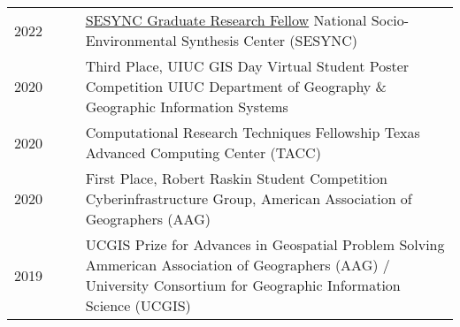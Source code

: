 \documentclass{acmcv}
\begin{document}
    \begin{longtable}{p{0.16\linewidth} p{0.84\linewidth}}
        2022 & \href{https://www.sesync.org/project/graduate-pursuits-request-for-proposals/financial-opacity-and-challenges-to-forest}{SESYNC Graduate Research Fellow} \newline National Socio-Environmental Synthesis Center (SESYNC)\\

        2020 & Third Place, UIUC GIS Day Virtual Student Poster Competition \newline UIUC Department of Geography \& Geographic Information Systems \\

        2020 & Computational Research Techniques Fellowship \newline Texas Advanced Computing Center (TACC)\\

        2020 & First Place, Robert Raskin Student Competition \newline Cyberinfrastructure Group, American Association of Geographers (AAG) \\

        2019 & UCGIS Prize for Advances in Geospatial Problem Solving \newline Ammerican Association of Geographers (AAG) / University Consortium for Geographic Information Science (UCGIS)  \\





    \end{longtable}
\end{document}
